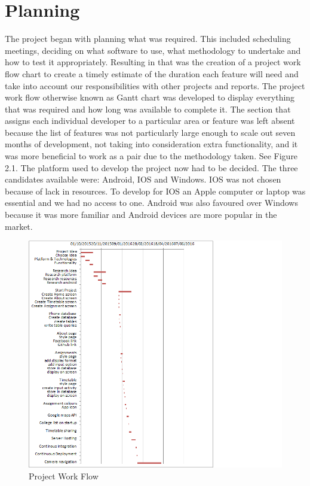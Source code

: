 \section{Planning}
The project began with planning what was required. This included scheduling meetings, deciding on what software to use, what methodology to undertake and how to test it appropriately. Resulting in that was the creation of a project work flow chart to create a timely estimate of the duration each feature will need and take into account our responsibilities with other projects and reports. The project work flow otherwise known as Gantt chart was developed to display everything that was required and how long was available to complete it. The section that assigns each individual developer to a particular area or feature was left absent because the list of features was not particularly large enough to scale out seven months of development, not taking into consideration extra functionality, and it was more beneficial to work as a pair due to the methodology taken. See Figure 2.1. The platform used to develop the project now had to be decided. The three candidates available were: Android, IOS and Windows. IOS was not chosen because of lack in resources. To develop for IOS an Apple computer or laptop was essential and we had no access to one. Android was also favoured over Windows because it was more familiar and Android devices are more popular in the market.

\begin{figure}
	\includegraphics{img/gannt.png}
	\caption{Project Work Flow}
\end{figure}

